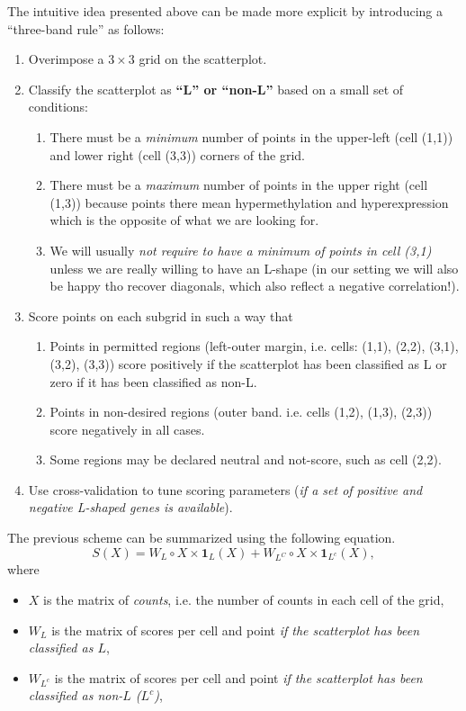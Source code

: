 \documentclass[10pt,letterpaper]{article}
\begin{document}
The intuitive idea presented above can be made more explicit by
introducing a ``three-band rule'' as follows:

\begin{enumerate}
\item Overimpose a $3\times 3$ grid on the scatterplot.
\item Classify the scatterplot as \textbf{``L'' or ``non-L''} based on a small set of conditions:
\begin{enumerate}
  \item There must be a \emph{minimum} number of points in the upper-left (cell (1,1)) and lower right (cell (3,3)) corners of the grid.
  \item There must be a \emph{maximum} number of points in the upper right (cell (1,3)) because points there mean hypermethylation and hyperexpression which is the opposite of what we are looking for.
  \item We will usually \emph{not require to have a minimum of points in cell (3,1)} unless we are really willing to have an L-shape (in our setting we will also be happy tho recover diagonals, which also reflect a negative correlation!).
\end{enumerate}
\item Score points on each subgrid in such a way that
\begin{enumerate}
    \item Points in permitted regions (left-outer margin, i.e. cells: (1,1), (2,2), (3,1), (3,2), (3,3)) score positively if the scatterplot has been classified as L or zero if it has been classified as non-L.
    \item Points in non-desired regions (outer band. i.e. cells (1,2), (1,3), (2,3)) score negatively in all cases.
    \item Some regions may be declared neutral and not-score, such as cell (2,2).
\end{enumerate}
\item Use cross-validation to tune scoring parameters (\textit{if a set of positive and negative L-shaped genes is available}). 
\end{enumerate}

The previous scheme can be summarized using the following equation.
\begin{equation}
S(X) = W_L \circ X \times \mathbf{1}_L(X) + W_{L^C} \circ X \times \mathbf{1}_{L^c}(X),
\end{equation} where

\begin{itemize}
\item ${X}$ is the matrix of \emph{counts}, i.e. the number of counts in each cell of the grid,
\item ${W_L}$ is the matrix of scores per cell and point \emph{if the scatterplot has been classified as $L$},
\item ${W_{L^c}}$ is the matrix of scores per cell and point \emph{if the scatterplot has been classified as non-$L$ ($L^c$)},
\end{itemize}
\end{document}
